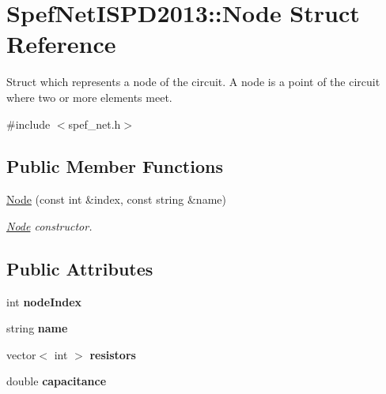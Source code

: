 \hypertarget{structSpefNetISPD2013_1_1Node}{\section{Spef\-Net\-I\-S\-P\-D2013\-:\-:Node Struct Reference}
\label{structSpefNetISPD2013_1_1Node}
}


Struct which represents a node of the circuit. A node is a point of the circuit where two or more elements meet.  




{\ttfamily \#include $<$spef\-\_\-net.\-h$>$}

\subsection*{Public Member Functions}
\begin{DoxyCompactItemize}
\item 
\hyperlink{structSpefNetISPD2013_1_1Node_afe9790ca4fcf757354ffb0dc3b578646}{Node} (const int \&index, const string \&name)
\begin{DoxyCompactList}\small\item\em \hyperlink{structSpefNetISPD2013_1_1Node}{Node} constructor. \end{DoxyCompactList}\end{DoxyCompactItemize}
\subsection*{Public Attributes}
\begin{DoxyCompactItemize}
\item 
\hypertarget{structSpefNetISPD2013_1_1Node_ae2b9605ff0872b8b12a8bc27e1a89540}{int {\bfseries node\-Index}}\label{structSpefNetISPD2013_1_1Node_ae2b9605ff0872b8b12a8bc27e1a89540}

\item 
\hypertarget{structSpefNetISPD2013_1_1Node_a7bc1303eeb250a3f7e047b8ec03d5e3e}{string {\bfseries name}}\label{structSpefNetISPD2013_1_1Node_a7bc1303eeb250a3f7e047b8ec03d5e3e}

\item 
\hypertarget{structSpefNetISPD2013_1_1Node_a0fe85a2441e7652f6a593abd9460ac85}{vector$<$ int $>$ {\bfseries resistors}}\label{structSpefNetISPD2013_1_1Node_a0fe85a2441e7652f6a593abd9460ac85}

\item 
\hypertarget{structSpefNetISPD2013_1_1Node_ae5a332384e934554beee8f743670506d}{double {\bfseries capacitance}}\label{structSpefNetISPD2013_1_1Node_ae5a332384e934554beee8f743670506d}

\end{DoxyCompactItemize}


